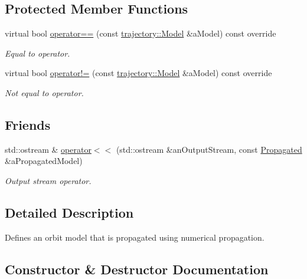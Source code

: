 \subsection*{Protected Member Functions}
\begin{DoxyCompactItemize}
\item 
virtual bool \hyperlink{classostk_1_1astro_1_1trajectory_1_1orbit_1_1models_1_1_propagated_a29b52ccf653fbd84699edab0f198f590}{operator==} (const \hyperlink{classostk_1_1astro_1_1trajectory_1_1_model}{trajectory\+::\+Model} \&a\+Model) const override
\begin{DoxyCompactList}\small\item\em Equal to operator. \end{DoxyCompactList}\item 
virtual bool \hyperlink{classostk_1_1astro_1_1trajectory_1_1orbit_1_1models_1_1_propagated_aeffaddcde5540fd1226add8466415d08}{operator!=} (const \hyperlink{classostk_1_1astro_1_1trajectory_1_1_model}{trajectory\+::\+Model} \&a\+Model) const override
\begin{DoxyCompactList}\small\item\em Not equal to operator. \end{DoxyCompactList}\end{DoxyCompactItemize}
\subsection*{Friends}
\begin{DoxyCompactItemize}
\item 
std\+::ostream \& \hyperlink{classostk_1_1astro_1_1trajectory_1_1orbit_1_1models_1_1_propagated_aa61df3429a00e0f64a497af2c81075c0}{operator$<$$<$} (std\+::ostream \&an\+Output\+Stream, const \hyperlink{classostk_1_1astro_1_1trajectory_1_1orbit_1_1models_1_1_propagated}{Propagated} \&a\+Propagated\+Model)
\begin{DoxyCompactList}\small\item\em Output stream operator. \end{DoxyCompactList}\end{DoxyCompactItemize}


\subsection{Detailed Description}
Defines an orbit model that is propagated using numerical propagation. 

\subsection{Constructor \& Destructor Documentation}
\mbox{\label{classostk_1_1astro_1_1trajectory_1_1orbit_1_1models_1_1_propagated_a2115209c1b1167f655ff648c38b1659f}} 
